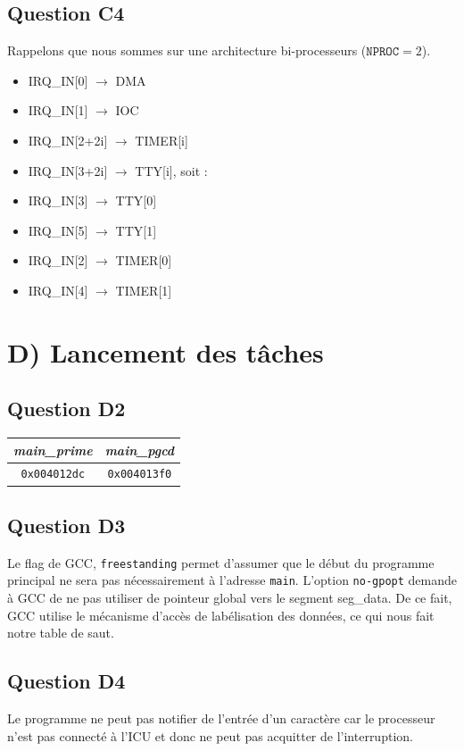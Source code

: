 \documentclass[10pt]{article}
\begin{document}
\subsection{Question C4}
Rappelons que nous sommes sur une architecture bi-processeurs ($\texttt{NPROC}
=2$).
\begin{itemize}
  \item IRQ\_IN[0] $\rightarrow$ DMA
  \item IRQ\_IN[1] $\rightarrow$ IOC
  \item IRQ\_IN[2+2i] $\rightarrow$ TIMER[i]
  \item IRQ\_IN[3+2i] $\rightarrow$ TTY[i], soit :
  \item IRQ\_IN[3] $\rightarrow$ TTY[0]
  \item IRQ\_IN[5] $\rightarrow$ TTY[1]
  \item IRQ\_IN[2] $\rightarrow$ TIMER[0]
  \item IRQ\_IN[4] $\rightarrow$ TIMER[1]
\end{itemize}

\section{D) Lancement des tâches}

\subsection{Question D2}
\begin{center}
  \begin{tabular}{|c|c|}
    \hline
    {\it main\_prime} & {\it main\_pgcd} \\ \hline
    \texttt{0x004012dc} & \texttt{0x004013f0} \\ \hline
  \end{tabular}
\end{center}

\subsection{Question D3}
Le flag de GCC, \texttt{freestanding} permet d'assumer que le début du programme
principal ne sera pas nécessairement à l'adresse \texttt{main}. L'option
\texttt{no-gpopt} demande à GCC de ne pas utiliser de pointeur global vers le
segment seg\_data. De ce fait, GCC utilise le mécanisme d'accès de labélisation
des données, ce qui nous fait notre table de saut.

\subsection{Question D4}
Le programme ne peut pas notifier de l'entrée d'un caractère car le processeur
n'est pas connecté à l'ICU et donc ne peut pas acquitter de l'interruption.
\end{document}
